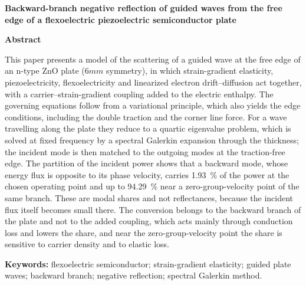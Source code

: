\documentclass[11pt,a4paper]{article}
\begin{document}
\begin{center}\bfseries \bfseries Backward-branch negative reflection of guided waves from the
free edge of a flexoelectric piezoelectric semiconductor plate\end{center}
\medskip
\noindent\textbf{Abstract}\par\smallskip
\noindent
This paper presents a model of the scattering of a guided wave at the free edge of an n-type ZnO plate ($6mm$ symmetry), in which strain-gradient elasticity, piezoelectricity, flexoelectricity and linearized electron drift--diffusion act together, with a carrier--strain-gradient coupling added to the electric enthalpy.  The governing equations follow from a variational principle, which also yields the edge conditions, including the double traction and the corner line force.  For a wave travelling along the plate they reduce to a quartic eigenvalue problem, which is solved at fixed frequency by a spectral Galerkin expansion through the thickness; the incident mode is then matched to the outgoing modes at the traction-free edge.  The partition of the incident power shows that a backward mode, whose energy flux is opposite to its phase velocity, carries \SI{1.93}{\percent} of the power at the chosen operating point and up to \SI{94.29}{\percent} near a zero-group-velocity point of the same branch.  These are modal shares and not reflectances, because the incident flux itself becomes small there.  The conversion belongs to the backward branch of the plate and not to the added coupling, which acts mainly through conduction loss and lowers the share, and near the zero-group-velocity point the share is sensitive to carrier density and to elastic loss.

\medskip
\noindent\textbf{Keywords:} flexoelectric semiconductor; strain-gradient
elasticity; guided plate waves; backward branch; negative reflection; spectral
Galerkin method.
\end{document}
